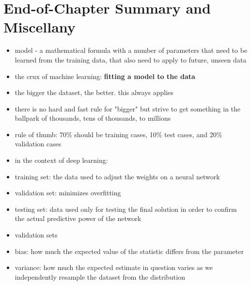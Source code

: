 \documentclass[11pt, twocolumn]{report}
\begin{document}
\section{End-of-Chapter Summary and Miscellany}
\begin{itemize}
  \item model - a mathematical formula with a number of parameters that need to
    be learned from the training data, that also need to apply to future,
    unseen data
  \item the crux of machine learning: \textbf{fitting a model to the data}
  \item the bigger the dataset, the better. this always applies
  \item there is no hard and fast rule for "bigger" but strive to get something
    in the ballpark of thousands, tens of thousands, to millions
  \item rule of thumb: 70\% should be training cases, 10\% test cases, and 20\%
    validation cases
  \item in the context of deep learning:
  \item training set: the data used to adjust the weights on a neural network
  \item validation set: minimizes overfitting
  \item testing set: data used only for testing the final solution in order to
    confirm the actual predictive power of the network
  \item validation sets
  \item bias: how much the expected value of the statistic differs from the
    parameter
  \item variance: how much the expected estimate in question varies as
    we independently resample the dataset from the distribution
\end{itemize}
\end{document}
